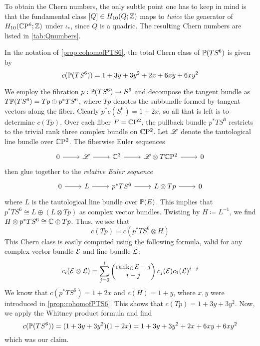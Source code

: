 To obtain the Chern numbers, the only subtle point one has to keep in mind is that the fundamental class $[Q]\in H_{10}(Q;\Z)$ maps to \emph{twice} the generator of $H_{10}(\CP^6;\Z)$ under $\iota_*$, since $Q$ is a quadric. The resulting Chern numbers are listed in \cref{tab:Qnumbers}.

\begin{prop}
	In the notation of \cref{prop:cohomofPTS6}, the total Chern class of $\P(TS^6)$ is given by 
	\begin{equation*}
		c(\P(TS^6))=1+3y+3y^2+2x+6xy+6xy^2
	\end{equation*}
\end{prop}
\begin{myproof}
	We employ the fibration $p:\P(TS^6)\to S^6$ and decompose the tangent bundle as $T\P(TS^6)=Tp\oplus p^*TS^6$, where $Tp$ denotes the subbundle formed by tangent vectors along the fiber. Clearly $p^*c(S^6)=1+2x$, so all that is left is to determine $c(Tp)$. Over each fiber $F=\CP^2$, the pullback bundle $p^*TS^6$ restricts to the trivial rank three complex bundle on $\CP^2$. Let $\ms L$ denote the tautological line bundle over $\CP^2$. The fiberwise Euler sequences
	\begin{equation*}
		\begin{tikzcd}
			0 \ar[r] & \ms L \ar[r] & \C^3 \ar[r] & \ms L\otimes T\CP^2 \ar[r] & 0	
		\end{tikzcd}
	\end{equation*}
	then glue together to the \emph{relative Euler sequence}
	\begin{equation*}
		\begin{tikzcd}
			0 \ar[r] & L \ar[r] & p^*TS^6 \ar[r] & L\otimes Tp \ar[r] & 0
		\end{tikzcd}
	\end{equation*}
	where $L$ is the tautological line bundle over $\P(E)$. This implies that $p^*TS^6\cong L\oplus (L\otimes Tp)$ as complex vector bundles. Twisting by $H\coloneqq L^{-1}$, we find $H\otimes p^*TS^6\cong \C\oplus Tp$. Thus, we see that
	\begin{equation*}
		c(Tp)=c(p^*TS^6\otimes H)
	\end{equation*}
	This Chern class is easily computed using the following formula, valid for any complex vector bundle $\mc E$ and line bundle $\mc L$:
	\begin{equation*}
		c_i(\mc E\otimes \mc L)=\sum_{j=0}^i 
		\begin{pmatrix}
			\rank_\C \mc E-j \\ i-j 
		\end{pmatrix}
		c_j(\mc E)c_1(\mc L)^{i-j}
	\end{equation*}
	We know that $c(p^*TS^6)=1+2x$ and $c(H)=1+y$, where $x,y$ were introduced in \cref{prop:cohomofPTS6}. This shows that $c(Tp)=1+3y+3y^2$. Now, we apply the Whitney product formula and find
	\begin{equation*}
		c(\P(TS^6))=(1+3y+3y^2)(1+2x)=1+3y+3y^2+2x+6xy+6xy^2
	\end{equation*}
	which was our claim.
\end{myproof}

